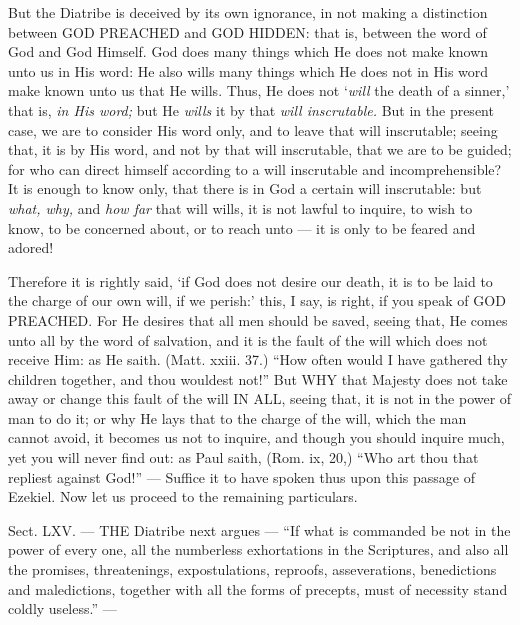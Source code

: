 But the Diatribe is deceived by its own ignorance, in not making a distinction between \textsc{GOD PREACHED} and \textsc{GOD HIDDEN}: that is, between the word of God and God Himself. God does many things which He does not make known unto us in His word: He also wills many things which He does not in His word make known unto us that He wills. Thus, He does not ‘\emph{will }the death of a sinner,’ that is, \emph{in His word; }but He \emph{wills }it by that \emph{will inscrutable. }But in the present case, we are to consider His word only, and to leave that will inscrutable; seeing that, it is by His word, and not by that will inscrutable, that we are to be guided; for who can direct himself according to a will inscrutable and incomprehensible? It is enough to know only, that there is in God a certain will inscrutable: but \emph{what, why, }and \emph{ how far }that will wills, it is not lawful to inquire, to wish to know, to be concerned about, or to reach unto — it is only to be feared and adored!

Therefore it is rightly said, ‘if God does not desire our death, it is to be laid to the charge of our own will, if we perish:’ this, I say, is right, if you speak of \textsc{GOD PREACHED}. For He desires that all men should be saved, seeing that, He comes unto all by the word of salvation, and it is the fault of the will which does not receive Him: as He saith. (Matt. xxiii. 37.) “How often would I have gathered thy children together, and thou wouldest not!” But \textsc{WHY }that Majesty does not take away or change this fault of the will \textsc{IN ALL}, seeing that, it is not in the power of man to do it; or why He lays that to the charge of the will, which the man cannot avoid, it becomes us not to inquire, and though you should inquire much, yet you will never find out: as Paul saith, (Rom. ix, 20,) “Who art thou that repliest against God!” — Suffice it to have spoken thus upon this passage of Ezekiel. Now let us proceed to the remaining particulars.


Sect. LXV. — THE Diatribe next argues — “If what is commanded be not in the power of every one, all the numberless exhortations in the Scriptures, and also all the promises, threatenings, expostulations, reproofs, asseverations, benedictions and maledictions, together with all the forms of precepts, must of necessity stand coldly useless.” —

